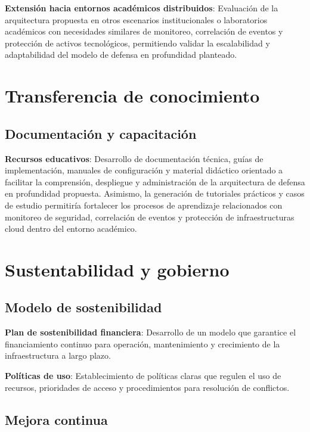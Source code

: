 \textbf{Extensión hacia entornos académicos distribuidos}:  
Evaluación de la arquitectura propuesta en otros escenarios institucionales o laboratorios académicos con necesidades similares de 
monitoreo, correlación de eventos y protección de activos tecnológicos, permitiendo validar la escalabilidad y adaptabilidad del modelo de 
defensa en profundidad planteado.

\section{Transferencia de conocimiento}
\noindent

\subsection{Documentación y capacitación}
\noindent

\textbf{Recursos educativos}:  
Desarrollo de documentación técnica, guías de implementación, manuales de configuración y material didáctico orientado a facilitar la 
comprensión, despliegue y administración de la arquitectura de defensa en profundidad propuesta. Asimismo, la generación de tutoriales 
prácticos y casos de estudio permitiría fortalecer los procesos de aprendizaje relacionados con monitoreo de seguridad, correlación de 
eventos y protección de infraestructuras cloud dentro del entorno académico.

\section{Sustentabilidad y gobierno}
\noindent

\subsection{Modelo de sostenibilidad}
\noindent

\textbf{Plan de sostenibilidad financiera}: Desarrollo de un modelo que garantice el financiamiento continuo para operación, mantenimiento 
y crecimiento de la infraestructura a largo plazo.

\textbf{Políticas de uso}: Establecimiento de políticas claras que regulen el uso de recursos, prioridades de acceso y procedimientos para 
resolución de conflictos.

\subsection{Mejora continua}
\noindent

